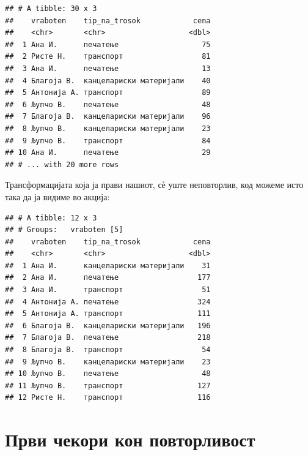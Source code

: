 \documentclass[
]{book}
\newenvironment{Shaded}{\begin{snugshade}}{\end{snugshade}}
\newcommand{\KeywordTok}[1]{\textcolor[rgb]{0.13,0.29,0.53}{\textbf{#1}}}
\newcommand{\NormalTok}[1]{#1}
\newcommand{\OperatorTok}[1]{\textcolor[rgb]{0.81,0.36,0.00}{\textbf{#1}}}
\newcommand{\StringTok}[1]{\textcolor[rgb]{0.31,0.60,0.02}{#1}}
\begin{document}
\begin{verbatim}
## # A tibble: 30 x 3
##    vraboten    tip_na_trosok            cena
##    <chr>       <chr>                   <dbl>
##  1 Ана И.      печатење                   75
##  2 Ристе Н.    транспорт                  81
##  3 Ана И.      печатење                   13
##  4 Благоја В.  канцелариски материјали    40
##  5 Антонија А. транспорт                  89
##  6 Љупчо В.    печатење                   48
##  7 Благоја В.  канцелариски материјали    96
##  8 Љупчо В.    канцелариски материјали    23
##  9 Љупчо В.    транспорт                  84
## 10 Ана И.      печатење                   29
## # ... with 20 more rows
\end{verbatim}

Трансформацијата која ја прави нашиот, сѐ уште неповторлив, код можеме исто така да ја видиме во акција:

\begin{Shaded}
\end{Shaded}

\begin{verbatim}
## # A tibble: 12 x 3
## # Groups:   vraboten [5]
##    vraboten    tip_na_trosok            cena
##    <chr>       <chr>                   <dbl>
##  1 Ана И.      канцелариски материјали    31
##  2 Ана И.      печатење                  177
##  3 Ана И.      транспорт                  51
##  4 Антонија А. печатење                  324
##  5 Антонија А. транспорт                 111
##  6 Благоја В.  канцелариски материјали   196
##  7 Благоја В.  печатење                  218
##  8 Благоја В.  транспорт                  54
##  9 Љупчо В.    канцелариски материјали    23
## 10 Љупчо В.    печатење                   48
## 11 Љупчо В.    транспорт                 127
## 12 Ристе Н.    транспорт                 116
\end{verbatim}

\hypertarget{ux43fux440ux432ux438-ux447ux435ux43aux43eux440ux438-ux43aux43eux43d-ux43fux43eux432ux442ux43eux440ux43bux438ux432ux43eux441ux442}{%
\section{Први чекори кон повторливост}\label{ux43fux440ux432ux438-ux447ux435ux43aux43eux440ux438-ux43aux43eux43d-ux43fux43eux432ux442ux43eux440ux43bux438ux432ux43eux441ux442}}
\end{document}

